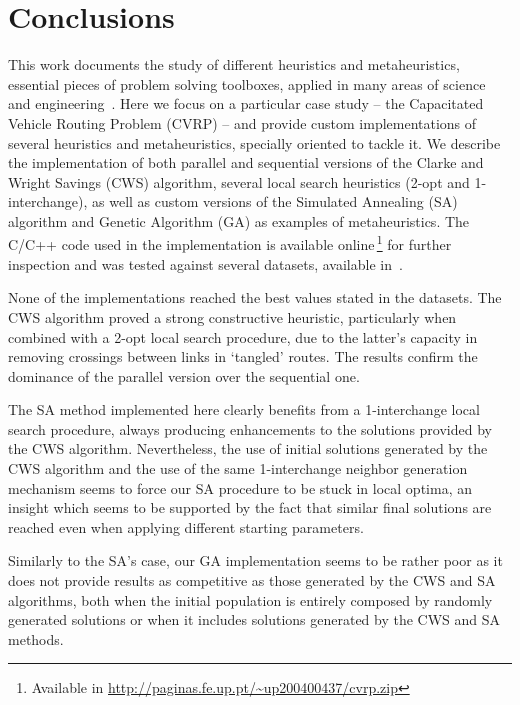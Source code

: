 \section{Conclusions}
\label{sec:conclusions}

This work documents the study of different heuristics and metaheuristics, 
essential pieces of problem solving toolboxes, applied in many areas of 
science and engineering~\cite{6603883,Kytojoki2007,becker2013evaluation}. Here 
we focus on a particular case study -- the Capacitated Vehicle Routing Problem 
(CVRP) -- and provide custom implementations of several 
heuristics and metaheuristics, specially oriented to tackle it. We 
describe the implementation of both parallel and 
sequential versions of the Clarke and Wright Savings (CWS) algorithm, several 
local search heuristics (2-opt and 1-interchange), as well as custom versions 
of the Simulated Annealing (SA) algorithm and Genetic Algorithm (GA) as 
examples of metaheuristics. The C\slash C++ code used in the implementation is 
available online\,\footnote{Available in \url{http://paginas.fe.up.pt/~up200400437/cvrp.zip}} for further inspection and was tested against several 
datasets, available in~\cite{website:cvrp-datasets}.\vertbreak

None of the implementations reached the best values stated in the datasets. The 
CWS algorithm proved a strong constructive heuristic, particularly when combined 
with a 2-opt local search procedure, due to the latter's capacity in removing 
crossings between links in `tangled' routes. The results confirm the dominance 
of the parallel version over the sequential one.\vertbreak 

The SA method implemented here clearly benefits from a 1-interchange local 
search procedure, always producing enhancements to the solutions provided by the 
CWS algorithm. Nevertheless, the 
use of initial solutions generated by the CWS algorithm and the use of the same 
1-interchange neighbor generation mechanism seems to force our SA procedure to 
be stuck in local optima, an insight which seems to be supported by the 
fact that similar final solutions are reached even when applying different starting 
parameters.\vertbreak

Similarly to the SA's case, our GA implementation seems to be rather poor as it 
does not provide results as competitive as those generated by the CWS and SA 
algorithms, both when the initial population is entirely composed by randomly 
generated solutions or when it includes solutions generated by the CWS and SA 
methods.



